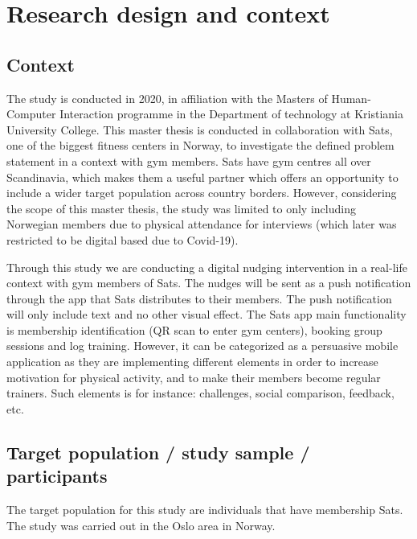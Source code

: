 \section{Research design and context}
\subsection{Context  }

The study is conducted in 2020, in affiliation with the Masters of Human-Computer Interaction programme in the Department of technology at Kristiania University College. This master thesis is conducted in collaboration with Sats, one of the biggest fitness centers in Norway, to investigate the defined problem statement in a context with gym members. Sats have gym centres all over Scandinavia, which makes them a useful partner which offers an opportunity to include a wider target population across country borders. However, considering the scope of this master thesis, the study was limited to only including Norwegian members due to physical attendance for interviews (which later was restricted to be digital based due to Covid-19). 

Through this study we are conducting a digital nudging intervention in a real-life context with gym members of Sats. The nudges will be sent as a push notification through the app that Sats distributes to their members. The push notification will only include text and no other visual effect. The Sats app main functionality is membership identification (QR scan to enter gym centers), booking group sessions and log training. However, it can be categorized as a persuasive mobile application as they are implementing different elements in order to increase motivation for physical activity, and to make their members become regular trainers. Such elements is for instance: challenges, social comparison, feedback, etc. 

\subsection{Target population / study sample / participants}

The target population for this study are individuals that have membership Sats. The study was carried out in the Oslo area in Norway.  

